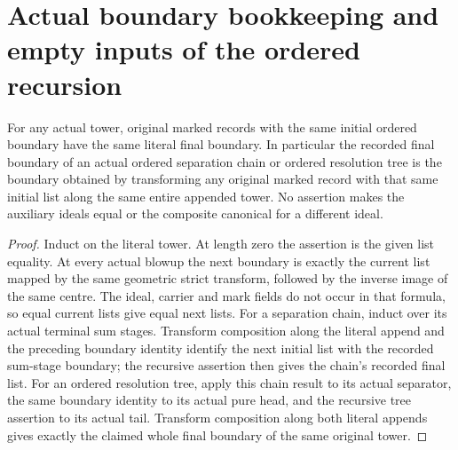 \section{Actual boundary bookkeeping and empty inputs of the ordered recursion}

\begin{lemma}
\label{hir:original-ordered-recursion-literal-boundary}
\leanok
For any actual tower, original marked records with the same initial
ordered boundary have the same literal final boundary. In particular
the recorded final boundary of an actual ordered separation chain or
ordered resolution tree is the boundary obtained by transforming any
original marked record with that same initial list along the same
entire appended tower. No assertion makes the auxiliary ideals equal
or the composite canonical for a different ideal.
\end{lemma}
\begin{proof}
Induct on the literal tower. At length zero the assertion is the given
list equality. At every actual blowup the next boundary is exactly
the current list mapped by the same geometric strict transform, followed
by the inverse image of the same centre. The ideal, carrier and mark
fields do not occur in that formula, so equal current lists give equal
next lists. For a separation chain, induct over its actual terminal
sum stages. Transform composition along the literal append and the
preceding boundary identity identify the next initial list with the
recorded sum-stage boundary; the recursive assertion then gives the
chain's recorded final list. For an ordered resolution tree, apply this
chain result to its actual separator, the same boundary identity to its
actual pure head, and the recursive tree assertion to its actual tail.
Transform composition along both literal appends gives exactly the
claimed whole final boundary of the same original tower.
\end{proof}

